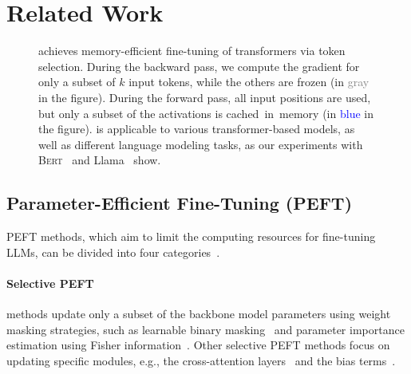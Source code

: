 \section{Related Work}

\label{sec:related-work}
\begin{figure}[t]
\centering
\caption{\method achieves memory-efficient fine-tuning of transformers via token selection.
		During the backward pass, we compute the gradient for only a subset of $k$ input tokens, while the others are frozen (in \textcolor{gray}{gray} in the figure).
		During the forward pass, all input positions are used, but only a subset of the activations is cached~in~memory (in \textcolor{blue}{blue} in the figure).
		\method is applicable to various transformer-based models, as well as different language modeling tasks, as our experiments with \textsc{Bert}~\citep{devlin_19} and Llama~\citep{touvron_23} show.
}
\label{fig:method}
\end{figure}

\subsection{Parameter-Efficient Fine-Tuning (PEFT)}
PEFT methods, which aim to limit the computing resources for fine-tuning LLMs, 
can be divided into four categories~\citep{DBLP:journals/corr/abs-2403-14608,DBLP:journals/corr/abs-2312-12148}.

\paragraph{Selective PEFT} methods update only a subset of the backbone model parameters
using weight masking strategies, such as
learnable binary masking~\citep{DBLP:conf/acl/GuoRK20} and parameter importance estimation using Fisher information~\citep{DBLP:conf/nips/SungNR21,DBLP:conf/emnlp/DasZS0Z23}. Other selective PEFT methods focus on updating specific modules,
e.g., the cross-attention layers~\citep{DBLP:conf/emnlp/Gheini0M21} and the bias terms~\citep{zaken_22,DBLP:conf/acl/LawtonKTGS23}.  

